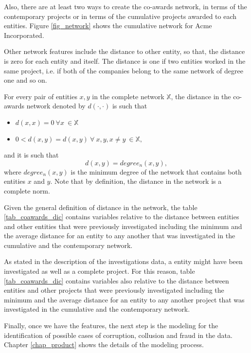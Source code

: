 Also, there are at least two ways to create the  co-awards network, in terms of the contemporary projects or in terms of the cumulative projects awarded to each entities. Figure \ref{fig_network} shows the cumulative network for Acme Incorporated.

Other network features include the distance to other entity, so that, the distance is zero for each entity and itself. The distance is one if two entities worked in the same project, i.e. if both of the companies belong to the same network of degree one and so on.

\begin{definition}
For every pair of  entities $x, y$ in the complete network $\mathbb{X}$, the distance in the co-awards network denoted by $d(\cdot,	\cdot)$ is such that
\begin{itemize}
\item $d(x,x)=0 \ \forall x \ \in  \mathbb{X} $
\item $0<d(x,y)=d(x,y) \ \forall \ x, y , x\neq y \ \in  \mathbb{X},$
\end{itemize}
and it is such that 
$$ d(x,y) = degree_{n}(x,y), $$
where $degree_{n}(x,y) $ is the minimum degree of the network that contains both entities $x$ and $y$.
Note that by definition, the distance in the network is a complete norm. 
\end{definition} 

Given the general definition of distance in the network, the table  \ref{tab_coawards_dic} contains variables relative to the distance between entities and  other entities that were previously investigated including the minimum and the  average distance for an entity to  any another that was investigated in the cumulative and the contemporary network.

As stated in the description of the investigations data, a entity might have been investigated as well as a complete project. For this reason, table \ref{tab_coawards_dic} contains variables also relative to the distance between entities and  other projects that were previously investigated including the minimum and the  average distance for an entity to any another project that was investigated in the cumulative and the contemporary network.

 
Finally, once we have the features, the next step is the modeling for the identification of possible cases of corruption, collusion and fraud in the data. Chapter \ref{chap_product} shows the details of the modeling process.
